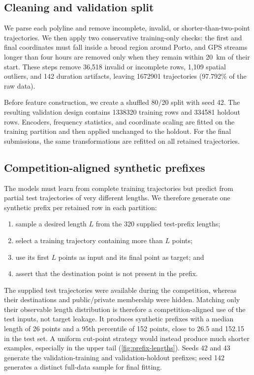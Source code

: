 \subsection{Cleaning and validation split}

We parse each polyline and remove incomplete, invalid, or shorter-than-two-point trajectories.  We then apply two conservative training-only checks: the first and final coordinates must fall inside a broad region around Porto, and GPS streams longer than four hours are removed only when they remain within 20~km of their start.  These steps remove 36,518 invalid or incomplete rows, 1,109 spatial outliers, and 142 duration artifacts, leaving \num{1672901} trajectories (97.792\% of the raw data).

Before feature construction, we create a shuffled 80/20 split with seed 42.  The resulting validation design contains \num{1338320} training rows and \num{334581} holdout rows.  Encoders, frequency statistics, and coordinate scaling are fitted on the training partition and then applied unchanged to the holdout.  For the final submissions, the same transformations are refitted on all retained trajectories.

\subsection{Competition-aligned synthetic prefixes}

The models must learn from complete training trajectories but predict from partial test trajectories of very different lengths.  We therefore generate one synthetic prefix per retained row in each partition:

\begin{enumerate}
  \item sample a desired length $L$ from the 320 supplied test-prefix lengths;
  \item select a training trajectory containing more than $L$ points;
  \item use its first $L$ points as input and its final point as target; and
  \item assert that the destination point is not present in the prefix.
\end{enumerate}

The supplied test trajectories were available during the competition, whereas their destinations and public/private membership were hidden.  Matching only their observable length distribution is therefore a competition-aligned use of the test inputs, not target leakage.  It produces synthetic prefixes with a median length of 26 points and a 95th percentile of 152 points, close to 26.5 and 152.15 in the test set.  A uniform cut-point strategy would instead produce much shorter examples, especially in the upper tail (\cref{fig:prefix-lengths}).  Seeds 42 and 43 generate the validation-training and validation-holdout prefixes; seed 142 generates a distinct full-data sample for final fitting.

